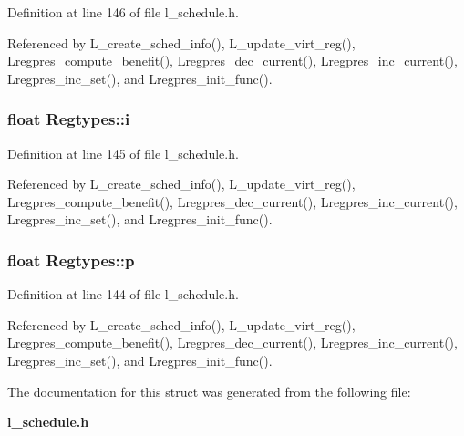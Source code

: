 Definition at line 146 of file l\_\-schedule.h.

Referenced by L\_\-create\_\-sched\_\-info(), L\_\-update\_\-virt\_\-reg(), Lregpres\_\-compute\_\-benefit(), Lregpres\_\-dec\_\-current(), Lregpres\_\-inc\_\-current(), Lregpres\_\-inc\_\-set(), and Lregpres\_\-init\_\-func().
\subsubsection{\setlength{\rightskip}{0pt plus 5cm}float \bf{Regtypes::i}}\label{structRegtypes_871a9fd7031bbcf4b52f327394260667}




Definition at line 145 of file l\_\-schedule.h.

Referenced by L\_\-create\_\-sched\_\-info(), L\_\-update\_\-virt\_\-reg(), Lregpres\_\-compute\_\-benefit(), Lregpres\_\-dec\_\-current(), Lregpres\_\-inc\_\-current(), Lregpres\_\-inc\_\-set(), and Lregpres\_\-init\_\-func().
\subsubsection{\setlength{\rightskip}{0pt plus 5cm}float \bf{Regtypes::p}}\label{structRegtypes_2af8c8ba5d9e2ee614a045fa02272bd8}




Definition at line 144 of file l\_\-schedule.h.

Referenced by L\_\-create\_\-sched\_\-info(), L\_\-update\_\-virt\_\-reg(), Lregpres\_\-compute\_\-benefit(), Lregpres\_\-dec\_\-current(), Lregpres\_\-inc\_\-current(), Lregpres\_\-inc\_\-set(), and Lregpres\_\-init\_\-func().

The documentation for this struct was generated from the following file:\begin{CompactItemize}
\item 
\bf{l\_\-schedule.h}\end{CompactItemize}
